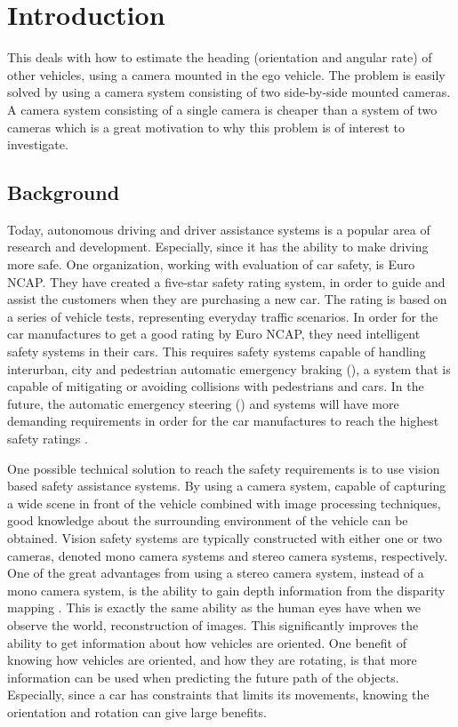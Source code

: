 \chapter{Introduction}
\label{cha:intro}
This \ms deals with how to estimate the heading (orientation and angular rate) of other vehicles, using a camera mounted in the ego vehicle.
The problem is easily solved by using a camera system consisting of two side-by-side mounted cameras.
A camera system consisting of a single camera is cheaper than a system of two cameras which is a great motivation to why this problem is of interest to investigate.

\section{Background}
Today, autonomous driving and driver assistance systems is a popular area of research and development.
Especially, since it has the ability to make driving more safe. 
One organization, working with evaluation of car safety, is Euro NCAP.
They have created a five-star safety rating system, in order to guide and assist the customers when they are purchasing a new car.
The rating is based on a series of vehicle tests, representing everyday traffic scenarios. 
In order for the car manufactures to get a good rating by Euro NCAP, they need intelligent safety systems in their cars.
This requires safety systems capable of handling \eg interurban, city and pedestrian automatic emergency braking (\abbrAEB), \ie a system that is capable of mitigating or avoiding collisions with pedestrians and cars.
In the future, the automatic emergency steering (\abbrAES) and \abbrAEB systems will have more demanding requirements in order for the car manufactures to reach the highest safety ratings \cite{EuroNCAP:2017}.

One possible technical solution to reach the safety requirements is to use vision based safety assistance systems.
By using a camera system, capable of capturing a wide scene in front of the vehicle combined with image processing techniques, good knowledge about the surrounding environment of the vehicle can be obtained.
Vision safety systems are typically constructed with either one or two cameras, denoted mono camera systems and stereo camera systems, respectively.
One of the great advantages from using a stereo camera system, instead of a mono camera system, is the ability to gain depth information from the disparity mapping \citep{Sivaraman:2013}.
This is exactly the same ability as the human eyes have when we observe the world, \ie reconstruction of  images.
This significantly improves the ability to get information about how vehicles are \eg oriented.
One benefit of knowing how vehicles are oriented, and how they are rotating, is that more information can be used when predicting the future path of the objects.
Especially, since \eg a car has constraints that limits its movements, knowing the orientation and rotation can give large benefits.

